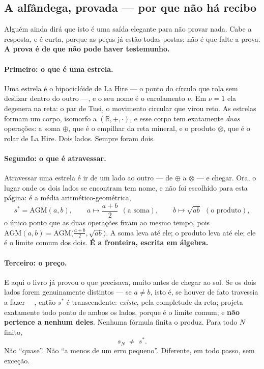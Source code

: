 \documentclass[11pt]{article}
\newcommand{\R}{\mathbb R}
\theoremstyle{plain}
\theoremstyle{remark}
\begin{document}
\subsection{A alfândega, provada --- por que não há recibo}

Alguém ainda dirá que isto é uma saída elegante para não provar nada. Cabe a
resposta, e é curta, porque as peças já estão todas postas: não é que falte a
prova. \textbf{A prova é de que não pode haver testemunho.}

\paragraph{Primeiro: o que é uma estrela.} Uma estrela é o hipociclóide de La
Hire --- o ponto do círculo que rola sem deslizar dentro do outro ---, e o seu
nome é o enrolamento $\nu$. Em $\nu=1$ ela degenera na reta: o par de Tusi, o
movimento circular que virou reto. As estrelas formam um corpo, isomorfo a
$(\R,+,\cdot)$, e esse corpo tem exatamente \emph{duas} operações: a soma
$\oplus$, que é o empilhar da reta mineral, e o produto $\otimes$, que é o
rolar de La Hire. Dois lados. Sempre foram dois.

\paragraph{Segundo: o que é atravessar.} Atravessar uma estrela é ir de um lado
ao outro --- de $\oplus$ a $\otimes$ --- e chegar. Ora, o lugar onde os dois
lados se encontram tem nome, e não foi escolhido para esta página: é a média
aritmético-geométrica,
\[
 s^{*}=\mathrm{AGM}(a,b),\qquad
 a\mapsto\frac{a+b}{2}\ \ (\text{a soma}),\qquad
 b\mapsto\sqrt{ab}\ \ (\text{o produto}),
\]
o único ponto que as duas operações fixam ao mesmo tempo, pois
$\mathrm{AGM}(a,b)=\mathrm{AGM}\bigl(\frac{a+b}{2},\sqrt{ab}\bigr)$. A soma leva
até ele; o produto leva até ele; ele é o limite comum dos dois. \textbf{É a
fronteira, escrita em álgebra.}

\paragraph{Terceiro: o preço.} E aqui o livro já provou o que precisava, muito
antes de chegar ao sol. Se os dois lados forem genuinamente distintos --- se
$a\neq b$, isto é, se houver de fato travessia a fazer ---, então $s^{*}$ é
transcendente: \emph{existe}, pela completude da reta; projeta exatamente todo
ponto de ambos os lados, porque é o limite comum; e \textbf{não pertence a
nenhum deles}. Nenhuma fórmula finita o produz. Para todo $N$ finito,
\[
 s_N \;\neq\; s^{*} .
\]
Não ``quase''. Não ``a menos de um erro pequeno''. Diferente, em todo passo, sem
exceção.
\end{document}
